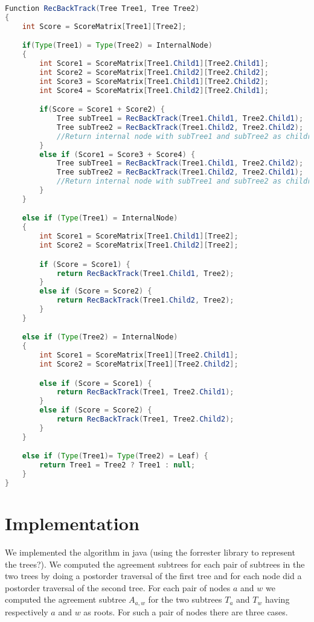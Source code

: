\begin{lstlisting}[language=Java, caption=Java pseudo code for BackTracking]
Function RecBackTrack(Tree Tree1, Tree Tree2)
{
	int Score = ScoreMatrix[Tree1][Tree2];

	if(Type(Tree1) = Type(Tree2) = InternalNode)
	{
		int Score1 = ScoreMatrix[Tree1.Child1][Tree2.Child1];
		int Score2 = ScoreMatrix[Tree1.Child2][Tree2.Child2];
		int Score3 = ScoreMatrix[Tree1.Child1][Tree2.Child2];
		int Score4 = ScoreMatrix[Tree1.Child2][Tree2.Child1];

		if(Score = Score1 + Score2) {
			Tree subTree1 = RecBackTrack(Tree1.Child1, Tree2.Child1);
			Tree subTree2 = RecBackTrack(Tree1.Child2, Tree2.Child2);
			//Return internal node with subTree1 and subTree2 as children
		}
		else if (Score1 = Score3 + Score4) {
			Tree subTree1 = RecBackTrack(Tree1.Child1, Tree2.Child2);
			Tree subTree2 = RecBackTrack(Tree1.Child2, Tree2.Child1);
			//Return internal node with subTree1 and subTree2 as children
		}
	}

	else if (Type(Tree1) = InternalNode)
	{
		int Score1 = ScoreMatrix[Tree1.Child1][Tree2]; 
		int Score2 = ScoreMatrix[Tree1.Child2][Tree2];

		if (Score = Score1) {
			return RecBackTrack(Tree1.Child1, Tree2);
		}
		else if (Score = Score2) {
			return RecBackTrack(Tree1.Child2, Tree2);
		}
	}

	else if (Type(Tree2) = InternalNode)
	{
		int Score1 = ScoreMatrix[Tree1][Tree2.Child1]; 
		int Score2 = ScoreMatrix[Tree1][Tree2.Child2];

		else if (Score = Score1) {
			return RecBackTrack(Tree1, Tree2.Child1);
		}
		else if (Score = Score2) {
			return RecBackTrack(Tree1, Tree2.Child2);
		}
	}

	else if (Type(Tree1)= Type(Tree2) = Leaf) {
		return Tree1 = Tree2 ? Tree1 : null; 
	}	
}
\end{lstlisting}



\todo{\dots}

\section{Implementation}
We implemented the algorithm in java (using the forrester \cite{?} library to represent the trees?). We computed the agreement subtrees for each pair of subtrees in the two trees by doing a postorder traversal of the first tree and for each node did a postorder traversal of the second tree. For each pair of nodes $a$ and $w$ we computed the agreement subtree $A_{a,w}$ for the two subtrees $T_a$ and $T_w$ having respectively $a$ and $w$ as roots. For such a pair of nodes there are three cases.

